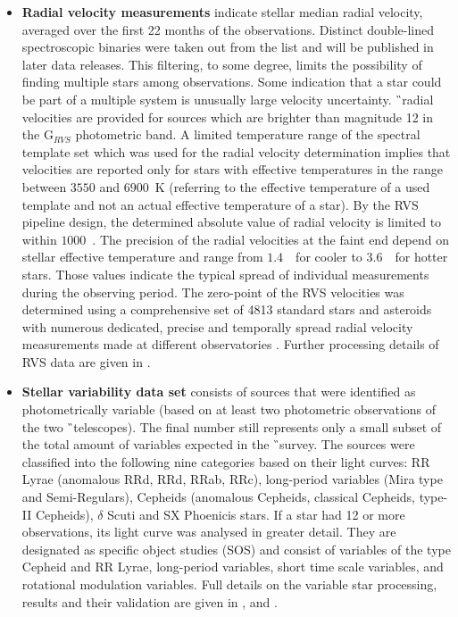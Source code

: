 \begin{itemize}
	\item \textbf{Radial velocity measurements} indicate stellar median radial velocity, averaged over the first 22 months of the observations. Distinct double-lined spectroscopic binaries were taken out from the list and will be published in later data releases. This filtering, to some degree, limits the possibility of finding multiple stars among observations. Some indication that a star could be part of a multiple system is unusually large velocity uncertainty. \G\ radial velocities are provided for sources which are brighter than magnitude 12 in the G$_{RVS}$ photometric band. A limited temperature range of the spectral template set which was used for the radial velocity determination implies that velocities are reported only for stars with effective temperatures in the range between $3550$ and $6900$~K (referring to the effective temperature of a used template and not an actual effective temperature of a star). By the RVS pipeline design, the determined absolute value of radial velocity is limited to within $1000$~\kms. The precision of the radial velocities at the faint end depend on stellar effective temperature and range from $1.4$~\kms\ for cooler to $3.6$~\kms\ for hotter stars. Those values indicate the typical spread of individual measurements during the observing period. The zero-point of the RVS velocities was determined using a comprehensive set of 4813 standard stars and asteroids with numerous dedicated, precise and temporally spread radial velocity measurements made at different observatories \cite{2018A&A...616A...7S}. Further processing details of RVS data are given in \citet{2018A&A...616A...6S}.
	
	\item \textbf{Stellar variability data set} consists of sources that were identified as photometrically variable (based on at least two photometric observations of the two \G\ telescopes). The final number still represents only a small subset of the total amount of variables expected in the \G\ survey. The sources were classified into the following nine categories based on their light curves: RR Lyrae (anomalous RRd, RRd, RRab, RRc), long-period variables (Mira type and Semi-Regulars), Cepheids (anomalous Cepheids, classical Cepheids, type-II Cepheids), $\delta$ Scuti and SX Phoenicis stars. If a star had 12 or more observations, its light curve was analysed in greater detail. They are designated as specific object studies (SOS) and consist of variables of the type Cepheid and RR Lyrae, long-period variables, short time scale variables, and rotational modulation variables. Full details on the variable star processing, results and their validation are given in \citet{2018A&A...618A..30H, 2018A&A...618A..58M, 2018A&A...620A.127M}, and \citet{2019A&A...622A..60C}.
	

\end{itemize}
